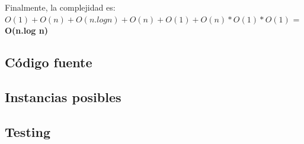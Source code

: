 Finalmente, la complejidad es: $O(1)+O(n)+O(n.log n)+O(n)+O(1)+O(n)*O(1)*O(1)$ = \textbf{O(n.log n)}

\subsection{Código fuente}



\subsection{Instancias posibles}



\subsection{Testing}